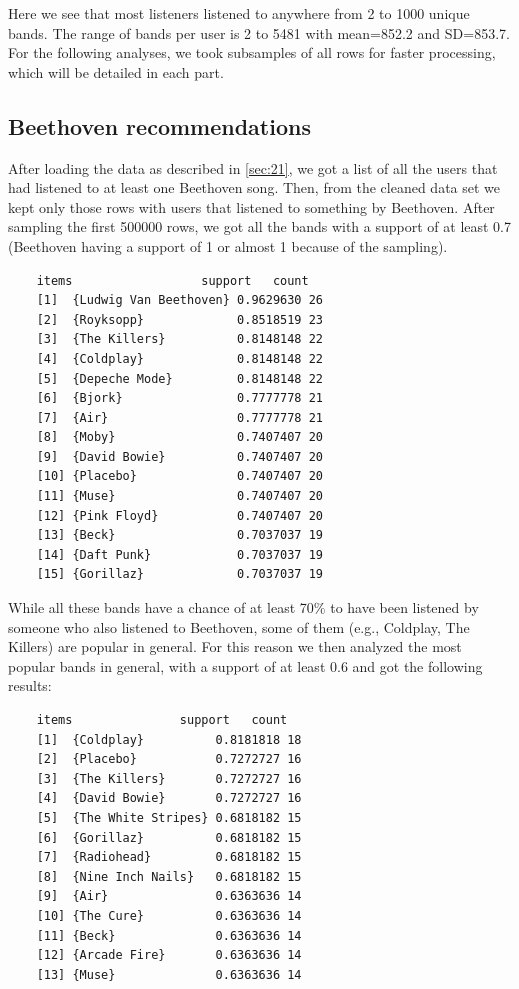 \documentclass[a4paper]{article}
\begin{document}
	\newline
	Here we see that most listeners listened to anywhere from 2 to 1000 unique bands. The range of bands per user is 2 to 5481 with mean=852.2 and SD=853.7.
	\newline
	\newline
	For the following analyses, we took subsamples of all rows for faster processing, which will be detailed in each part.  
	
	
	
	\subsection{Beethoven recommendations}
	\par\noindent After loading the data as described in \ref{sec:21}, we got a list of all the users that had listened to at least one Beethoven song. Then, from the cleaned data set we kept only those rows with users that listened to something by Beethoven. 
	After sampling the first 500000 rows, we got all the bands with a support of at least 0.7 (Beethoven having a support of 1 or almost 1 because of the sampling).
	\begin{lstlisting}
	items                  support   count
	[1]  {Ludwig Van Beethoven} 0.9629630 26   
	[2]  {Royksopp}             0.8518519 23   
	[3]  {The Killers}          0.8148148 22   
	[4]  {Coldplay}             0.8148148 22   
	[5]  {Depeche Mode}         0.8148148 22   
	[6]  {Bjork}                0.7777778 21   
	[7]  {Air}                  0.7777778 21   
	[8]  {Moby}                 0.7407407 20   
	[9]  {David Bowie}          0.7407407 20   
	[10] {Placebo}              0.7407407 20   
	[11] {Muse}                 0.7407407 20   
	[12] {Pink Floyd}           0.7407407 20   
	[13] {Beck}                 0.7037037 19   
	[14] {Daft Punk}            0.7037037 19   
	[15] {Gorillaz}             0.7037037 19  
	\end{lstlisting}
	\par\noindent While all these bands have a chance of at least 70\% to have been listened by someone who also listened to Beethoven, some of them (e.g., Coldplay, The Killers) are popular in general. For this reason we then analyzed the most popular bands in general, with a support of at least 0.6 and got the following results:
	\begin{lstlisting}
	items               support   count
	[1]  {Coldplay}          0.8181818 18   
	[2]  {Placebo}           0.7272727 16   
	[3]  {The Killers}       0.7272727 16   
	[4]  {David Bowie}       0.7272727 16   
	[5]  {The White Stripes} 0.6818182 15   
	[6]  {Gorillaz}          0.6818182 15   
	[7]  {Radiohead}         0.6818182 15   
	[8]  {Nine Inch Nails}   0.6818182 15   
	[9]  {Air}               0.6363636 14   
	[10] {The Cure}          0.6363636 14   
	[11] {Beck}              0.6363636 14   
	[12] {Arcade Fire}       0.6363636 14   
	[13] {Muse}              0.6363636 14   
	\end{lstlisting}
	
\end{document}
